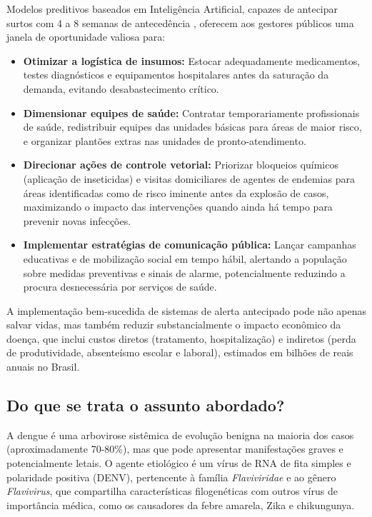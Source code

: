 Modelos preditivos baseados em Inteligência Artificial, capazes de antecipar surtos com 4 a 8 semanas de antecedência \cite{chen2025forecasting, xu2020dengue, roster2022machine}, oferecem aos gestores públicos uma janela de oportunidade valiosa para:
\begin{itemize}
    \item \textbf{Otimizar a logística de insumos:} Estocar adequadamente medicamentos, testes diagnósticos e equipamentos hospitalares antes da saturação da demanda, evitando desabastecimento crítico.
    \item \textbf{Dimensionar equipes de saúde:} Contratar temporariamente profissionais de saúde, redistribuir equipes das unidades básicas para áreas de maior risco, e organizar plantões extras nas unidades de pronto-atendimento.
    \item \textbf{Direcionar ações de controle vetorial:} Priorizar bloqueios químicos (aplicação de inseticidas) e visitas domiciliares de agentes de endemias para áreas identificadas como de risco iminente antes da explosão de casos, maximizando o impacto das intervenções quando ainda há tempo para prevenir novas infecções.
    \item \textbf{Implementar estratégias de comunicação pública:} Lançar campanhas educativas e de mobilização social em tempo hábil, alertando a população sobre medidas preventivas e sinais de alarme, potencialmente reduzindo a procura desnecessária por serviços de saúde.
\end{itemize}

A implementação bem-sucedida de sistemas de alerta antecipado pode não apenas salvar vidas, mas também reduzir substancialmente o impacto econômico da doença, que inclui custos diretos (tratamento, hospitalização) e indiretos (perda de produtividade, absenteísmo escolar e laboral), estimados em bilhões de reais anuais no Brasil.

\subsection{Do que se trata o assunto abordado?}

A dengue é uma arbovirose sistêmica de evolução benigna na maioria dos casos (aproximadamente 70-80\%), mas que pode apresentar manifestações graves e potencialmente letais. O agente etiológico é um vírus de RNA de fita simples e polaridade positiva (DENV), pertencente à família \textit{Flaviviridae} e ao gênero \textit{Flavivirus}, que compartilha características filogenéticas com outros vírus de importância médica, como os causadores da febre amarela, Zika e chikungunya.

